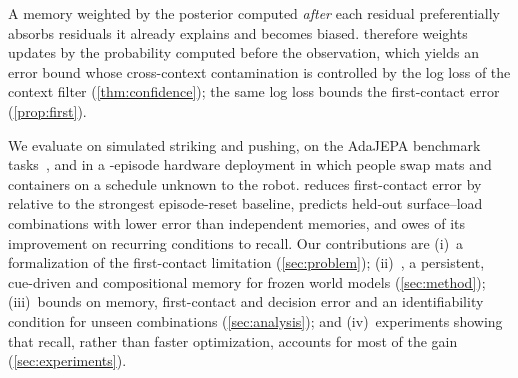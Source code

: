 A memory weighted by the posterior computed \emph{after} each residual preferentially absorbs residuals it already explains and becomes biased. \method therefore weights updates by the probability computed before the observation, which yields an error bound whose cross-context contamination is controlled by the log loss of the context filter (\cref{thm:confidence}); the same log loss bounds the first-contact error (\cref{prop:first}).

We evaluate \method on simulated striking and pushing, on the AdaJEPA benchmark tasks~\citep{wang2026adajepa}, and in a -episode hardware deployment in which people swap mats and containers on a schedule unknown to the robot. \method reduces first-contact error by  relative to the strongest episode-reset baseline, predicts held-out surface--load combinations with  lower error than independent memories, and owes  of its improvement on recurring conditions to recall. Our contributions are (i)~a formalization of the first-contact limitation (\cref{sec:problem}); (ii)~\method, a persistent, cue-driven and compositional memory for frozen world models (\cref{sec:method}); (iii)~bounds on memory, first-contact and decision error and an identifiability condition for unseen combinations (\cref{sec:analysis}); and (iv)~experiments showing that recall, rather than faster optimization, accounts for most of the gain (\cref{sec:experiments}).

